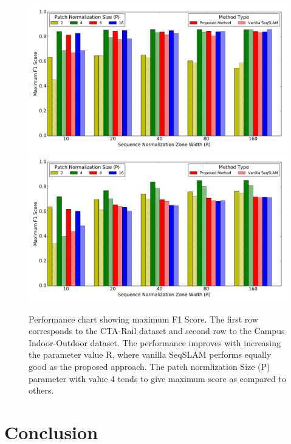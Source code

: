 \documentclass[twocolumn]{article}
\begin{document}
\begin{figure}[!htbp]
\centering
 \includegraphics[scale=0.4]{cta-bar-graph} \\
 \includegraphics[scale=0.4]{campus-io-bar-graph}
 \caption{Performance chart showing maximum F1 Score. The first row corresponds to the CTA-Rail dataset and second row to the Campus Indoor-Outdoor dataset. The performance improves with increasing the parameter value R, where vanilla SeqSLAM performs equally good as the proposed approach. The patch normlization Size (P) parameter with value 4 tends to give maximum score as compared to others.}
 \label{fig:performanceChart}
\end{figure}

\section{Conclusion}



\end{document}
